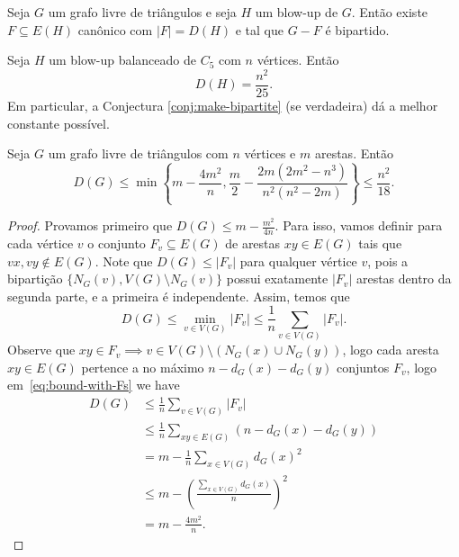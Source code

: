 \begin{theorem}[Simetrização]\label{thm:simetrizacao}
  Seja $G$ um grafo livre de triângulos e seja $H$ um blow-up de $G$.
  Então existe $F \subseteq E(H)$ canônico com $|F|=D(H)$ e tal que $G-F$ é bipartido.
\end{theorem}

\begin{corollary}
  Seja $H$ um blow-up balanceado de $C_5$ com $n$ vértices.
  Então \[ D(H) = \frac{n^2}{25}. \]
  Em particular, a Conjectura \ref{conj:make-bipartite} (se verdadeira) dá a melhor constante possível.
\end{corollary}

\begin{theorem}[EFPS] \label{thm:EFPS-bounds}
  Seja $G$ um grafo livre de triângulos com $n$ vértices e $m$ arestas.
  Então \[ D(G) \leq \min\left\{m-\frac{4m^2}{n}, \frac{m}{2} - \frac{2m(2m^2-n^3)}{n^2(n^2-2m)}\right\} \leq \frac{n^2}{18}. \]
\end{theorem}

\begin{proof}
  Provamos primeiro que $D(G) \leq m-\frac{m^2}{4n}$.
  Para isso, vamos definir para cada vértice $v$ o conjunto $F_v \subseteq E(G)$ de arestas $xy \in E(G)$ tais que $vx,vy \not\in E(G)$.
  Note que $D(G) \leq |F_v|$ para qualquer vértice $v$, pois a bipartição $\{N_G(v), V(G) \setminus N_G(v)\}$ possui exatamente $|F_v|$ arestas dentro da segunda parte, e a primeira é independente.
  Assim, temos que
  \begin{equation}\label{eq:bound-with-Fs}
     D(G) \leq \min_{v \in V(G)} |F_v| \leq \frac{1}{n} \sum_{v \in V(G)} |F_v|.
  \end{equation} 
  Observe que $xy \in F_v \implies v \in V(G) \setminus (N_G(x) \cup N_G(y))$, logo cada aresta $xy \in E(G)$ pertence a no máximo $n-d_G(x)-d_G(y)$ conjuntos $F_v$, logo em~\ref{eq:bound-with-Fs} we have
  \begin{align*}
    D(G) &\leq \frac{1}{n} \sum_{v \in V(G)} |F_v| \\
      &\leq \frac{1}{n} \sum_{xy \in E(G)} (n-d_G(x)-d_G(y)) \\
      &= m - \frac{1}{n} \sum_{x \in V(G)} d_G(x)^2 \\
      &\leq m-\left(\frac{\sum_{x \in V(G)} d_G(x)}{n}\right)^2 \\
      &=m-\frac{4m^2}{n}.
  \end{align*}

\end{proof}

